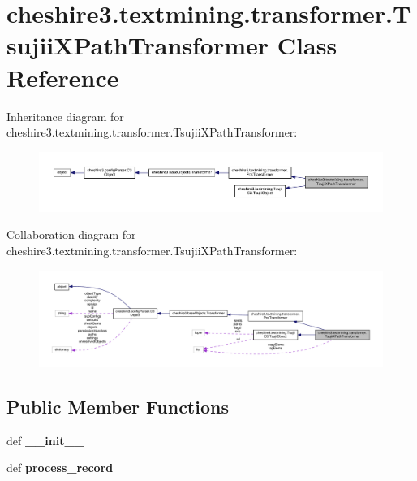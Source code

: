 \hypertarget{classcheshire3_1_1textmining_1_1transformer_1_1_tsujii_x_path_transformer}{\section{cheshire3.\-textmining.\-transformer.\-Tsujii\-X\-Path\-Transformer Class Reference}
\label{classcheshire3_1_1textmining_1_1transformer_1_1_tsujii_x_path_transformer}
}


Inheritance diagram for cheshire3.\-textmining.\-transformer.\-Tsujii\-X\-Path\-Transformer\-:
\nopagebreak
\begin{figure}[H]
\begin{center}
\leavevmode
\includegraphics[width=350pt]{classcheshire3_1_1textmining_1_1transformer_1_1_tsujii_x_path_transformer__inherit__graph}
\end{center}
\end{figure}


Collaboration diagram for cheshire3.\-textmining.\-transformer.\-Tsujii\-X\-Path\-Transformer\-:
\nopagebreak
\begin{figure}[H]
\begin{center}
\leavevmode
\includegraphics[width=350pt]{classcheshire3_1_1textmining_1_1transformer_1_1_tsujii_x_path_transformer__coll__graph}
\end{center}
\end{figure}
\subsection*{Public Member Functions}
\begin{DoxyCompactItemize}
\item 
\hypertarget{classcheshire3_1_1textmining_1_1transformer_1_1_tsujii_x_path_transformer_a64650b436e48a4c16d749f910e2cfd36}{def {\bfseries \-\_\-\-\_\-init\-\_\-\-\_\-}}\label{classcheshire3_1_1textmining_1_1transformer_1_1_tsujii_x_path_transformer_a64650b436e48a4c16d749f910e2cfd36}

\item 
\hypertarget{classcheshire3_1_1textmining_1_1transformer_1_1_tsujii_x_path_transformer_a1f24eba29f1a552164ba6b9ebf85a3d3}{def {\bfseries process\-\_\-record}}\label{classcheshire3_1_1textmining_1_1transformer_1_1_tsujii_x_path_transformer_a1f24eba29f1a552164ba6b9ebf85a3d3}

\end{DoxyCompactItemize}
